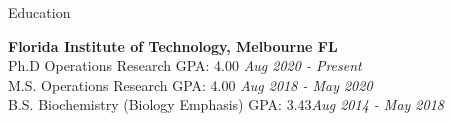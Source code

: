 

\begin{rSection}{Education}

    {\bf Florida Institute of Technology, Melbourne FL}
    \\ Ph.D Operations Research  GPA: 4.00 \hfill {\em Aug 2020 - Present}
    \\ M.S. Operations Research  GPA: 4.00 \hfill {\em Aug 2018 - May 2020}
    \\ B.S. Biochemistry (Biology Emphasis)    GPA: 3.43\hfill {\em Aug 2014 - May 2018}
\end{rSection}

